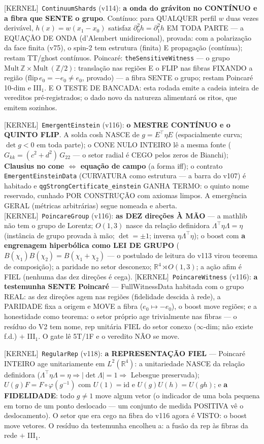 \documentclass[11pt]{article}
\providecommand{\kernelmk}[1]{\textsf{[KERNEL]}~\texttt{#1}}\providecommand{\knownmk}[1]{\textsf{[KNOWN]}~{#1}}\providecommand{\statusmk}[1]{\textsf{[#1]}}
\theoremstyle{definition}\newtheorem{deriv}{Derivação}
\begin{document}
\kernelmk{ContinuumShards} (v114): \textbf{a onda do gráviton no CONTÍNUO e a fibra que SENTE o grupo}. Contínuo: para QUALQUER perfil $w$ duas vezes derivável, $h(x)=w(x_1-x_0)$ satisfaz $\partial_0^2 h=\partial_1^2 h$ EM TODA PARTE --- a EQUAÇÃO DE ONDA (d'Alembert unidirecional), provada: com a polarização da face finita (v75), o spin-2 tem estrutura (finita) E propagação (contínua); restam TT/ghost contínuos. Poincaré: \texttt{theSensitiveWitness} --- o grupo $\mathrm{Mult}\,\mathbb{Z}\times\mathrm{Mult}\,(\mathbb{Z}/2)$: translação nas regiões E o FLIP nas fibras FIXANDO a região ($\mathrm{flip}\,e_0=-e_0\neq e_0$, provado) --- a fibra SENTE o grupo; restam Poincaré 10-dim e III$_1$. E O TESTE DE BANCADA: esta rodada emite a cadeia inteira de vereditos pré-registrados; o dado novo da natureza alimentará os ritos, que emitem sozinhos.

\kernelmk{EmergentEinstein} (v116): \textbf{o MESTRE CONTÍNUO e o QUINTO FLIP}. A solda cosh NASCE de $g=E^\top\eta E$ (espacialmente curva; $\det g<0$ em toda parte); o CONE NULO INTEIRO lê a mesma fonte ($G_{kk}=(c^2+d^2)\,G_{22}$ --- o setor radial é CEGO pelos zeros de Bianchi); \textbf{Clausius no cone $\iff$ equação de campo} (a forma iff); o contrato \texttt{EmergentEinsteinData} (CURVATURA como estrutura --- a barra do v107) é habitado e \texttt{qgStrongCertificate\_einstein} GANHA TERMO: o quinto nome reservado, cunhado POR CONSTRUÇÃO com axiomas limpos. A emergência GERAL (métricas arbitrárias) segue nomeada e aberta. \kernelmk{PoincareGroup} (v116): \textbf{as DEZ direções À MÃO} --- a mathlib não tem o grupo de Lorentz; $O(1,3)$ nasce da relação definidora $\Lambda^\top\eta\Lambda=\eta$ (instância de grupo provada à mão; $\det=\pm1$; inversa $\eta\Lambda^\top\eta$); o boost com \textbf{a engrenagem hiperbólica como LEI DE GRUPO} ($B(\chi_1)B(\chi_2)=B(\chi_1{+}\chi_2)$ --- o postulado de leitura do v113 virou teorema de composição); a paridade no setor desconexo; $\mathbb{R}^4\rtimes O(1,3)$; a ação afim é FIEL (nenhuma das dez direções é cega). \kernelmk{PoincareWitness} (v116): \textbf{a testemunha SENTE Poincaré} --- FullWitnessData habitada com o grupo REAL: as dez direções agem nas regiões (fidelidade descida à rede), a PARIDADE fixa a origem e MOVE a fibra ($e_0\mapsto-e_0$), o boost move regiões; e a honestidade como teorema: o setor próprio age trivialmente nas fibras --- o resíduo do V2 tem nome, rep unitária FIEL do setor conexo ($\infty$-dim; não existe f.d.) $+$ III$_1$. O gate lê 5T/1F e o veredito NÃO se move.

\kernelmk{RegularRep} (v118): \textbf{a REPRESENTAÇÃO FIEL} --- Poincaré INTEIRO age unitariamente em $L^2(\mathbb{R}^4)$: a unitariedade NASCE da relação definidora ($\Lambda^\top\eta\Lambda=\eta\Rightarrow|\det\Lambda|=1\Rightarrow$ Lebesgue preservada); $U(g)F=F\circ\varphi(g^{-1})$ com $U(1)=\mathrm{id}$ e $U(g)U(h)=U(gh)$; e \textbf{a FIDELIDADE}: todo $g\neq1$ move algum vetor (o indicador de uma bola pequena em torno de um ponto deslocado --- um conjunto de medida POSITIVA vê o deslocamento). O setor que era cego na fibra do v116 agora é VISTO: o boost move vetores. O resíduo da testemunha encolheu a: a fusão da rep às fibras da rede $+$ III$_1$.
\end{document}
